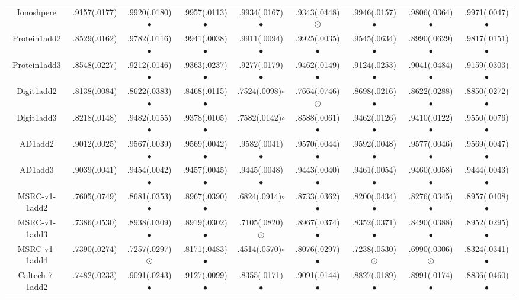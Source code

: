 \documentclass[10pt,journal,compsoc]{IEEEtran}
\begin{document}
\begin{table*}[!t]
{\begin{tabular}{c|| c c c c c c c c }
Ionoshpere      & .9157(.0177)& .9920(.0180)$\bullet$ & .9957(.0113)$\bullet$ & .9934(.0167)$\bullet$ & .9343(.0448){\tiny $\odot$} & .9946(.0157)$\bullet$ & .9806(.0364)$\bullet$ & .9971(.0047)$\bullet$ \\
Protein1add2    & .8529(.0162)& .9782(.0116)$\bullet$ & .9941(.0038)$\bullet$ & .9911(.0094)$\bullet$ & .9925(.0035)$\bullet$ & .9545(.0634)$\bullet$ & .8990(.0629)$\bullet$ & .9817(.0151)$\bullet$ \\
Protein1add3    & .8548(.0227)& .9212(.0146)$\bullet$ & .9363(.0237)$\bullet$ & .9277(.0179)$\bullet$ & .9462(.0149)$\bullet$ & .9124(.0253)$\bullet$ & .9041(.0484)$\bullet$ & .9159(.0303)$\bullet$ \\
Digit1add2      & .8138(.0084)& .8622(.0383)$\bullet$ & .8468(.0115)$\bullet$ & .7524(.0098)$\circ$   & .7664(.0746){\tiny $\odot$} & .8698(.0216)$\bullet$ & .8622(.0288)$\bullet$ & .8850(.0272)$\bullet$ \\
Digit1add3      & .8218(.0148)& .9482(.0155)$\bullet$ & .9378(.0105)$\bullet$ & .7582(.0142)$\circ$ & .8588(.0061)$\bullet$ & .9462(.0126)$\bullet$ & .9410(.0122)$\bullet$ & .9550(.0076)$\bullet$ \\
AD1add2         & .9012(.0025)& .9567(.0039)$\bullet$ & .9569(.0042)$\bullet$ & .9582(.0041)$\bullet$ & .9570(.0044)$\bullet$ & .9592(.0048)$\bullet$ & .9577(.0046)$\bullet$ & .9569(.0047)$\bullet$ \\
AD1add3         & .9039(.0041)& .9454(.0042)$\bullet$ & .9457(.0045)$\bullet$ & .9445(.0048)$\bullet$ & .9443(.0040)$\bullet$ & .9461(.0054)$\bullet$ & .9460(.0058)$\bullet$ & .9444(.0043)$\bullet$ \\
MSRC-v1-1add2   & .7605(.0749)& .8681(.0353)$\bullet$ & .8967(.0390)$\bullet$ & .6824(.0914)$\circ$ & .8733(.0362)$\bullet$ & .8200(.0434)$\bullet$ & .8276(.0345)$\bullet$ & .8957(.0408)$\bullet$ \\
MSRC-v1-1add3   & .7386(.0530)& .8938(.0309)$\bullet$ & .8919(.0302)$\bullet$ & .7105(.0820){\tiny $\odot$}& .8967(.0374)$\bullet$ & .8352(.0371)$\bullet$ & .8490(.0388)$\bullet$ & .8952(.0295)$\bullet$ \\
MSRC-v1-1add4   & .7390(.0274)& .7257(.0297){\tiny $\odot$} & .8171(.0483)$\bullet$ & .4514(.0570)$\circ$ & .8076(.0297)$\bullet$ & .7238(.0530){\tiny $\odot$} & .6990(.0306){\tiny $\odot$} & .8324(.0341)$\bullet$ \\
Caltech-7-1add2 & .7482(.0233)& .9091(.0243)$\bullet$ & .9127(.0099)$\bullet$ & .8355(.0171)$\bullet$ & .9091(.0144)$\bullet$ & .8827(.0189)$\bullet$ & .8991(.0174)$\bullet$ & .8836(.0460)$\bullet$ \\

\end{tabular}}
\end{table*}
\end{document}
